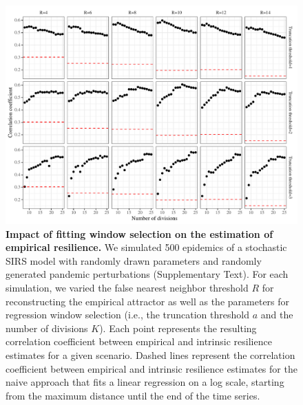 \documentclass[12pt]{article}
\begin{document}
\begin{figure}[!th]
\includegraphics[width=\textwidth]{../figure_analysis_random/figure_analysis_random.pdf}
\caption{
\textbf{Impact of fitting window selection on the estimation of empirical resilience.}
We simulated 500 epidemics of a stochastic SIRS model with randomly drawn parameters and randomly generated pandemic perturbations (Supplementary Text).
For each simulation, we varied the false nearest neighbor threshold $R$ for reconstructing the empirical attractor as well as the parameters for regression window selection (i.e., the truncation threshold $a$ and the number of divisions $K$).
Each point represents the resulting correlation coefficient between empirical and intrinsic resilience estimates for a given scenario.
Dashed lines represent the correlation coefficient between empirical and intrinsic resilience estimates for the naive approach that fits a linear regression on a log scale, starting from the maximum distance until the end of the time series.
}
\end{figure}

\pagebreak
\end{document}
